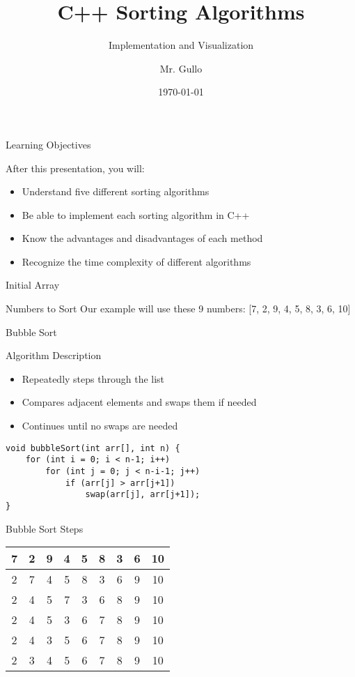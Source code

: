 \documentclass{beamer}
\title[Sorting Algorithms]{C++ Sorting Algorithms}
\subtitle{Implementation and Visualization}
\author[Mr. Gullo]{Mr. Gullo}
\date[\today]{\today}
\begin{document}
\frame{\titlepage}

\begin{frame}{Learning Objectives}
\begin{block}{After this presentation, you will:}
\begin{itemize}
\item Understand five different sorting algorithms
\item Be able to implement each sorting algorithm in C++
\item Know the advantages and disadvantages of each method
\item Recognize the time complexity of different algorithms
\end{itemize}
\end{block}
\end{frame}

\begin{frame}{Initial Array}
\begin{block}{Numbers to Sort}
Our example will use these 9 numbers: [7, 2, 9, 4, 5, 8, 3, 6, 10]
\end{block}
\end{frame}

\begin{frame}[fragile]{Bubble Sort}
\begin{block}{Algorithm Description}
\begin{itemize}
\item Repeatedly steps through the list
\item Compares adjacent elements and swaps them if needed
\item Continues until no swaps are needed
\end{itemize}
\end{block}

\begin{lstlisting}
void bubbleSort(int arr[], int n) {
    for (int i = 0; i < n-1; i++)
        for (int j = 0; j < n-i-1; j++)
            if (arr[j] > arr[j+1])
                swap(arr[j], arr[j+1]);
}
\end{lstlisting}
\end{frame}

\begin{frame}{Bubble Sort Steps}
\begin{center}
\begin{tabular}{|c|c|c|c|c|c|c|c|c|}
\hline
7 & 2 & 9 & 4 & 5 & 8 & 3 & 6 & 10 \\
\hline
2 & 7 & 4 & 5 & 8 & 3 & 6 & 9 & 10 \\
\hline
2 & 4 & 5 & 7 & 3 & 6 & 8 & 9 & 10 \\
\hline
2 & 4 & 5 & 3 & 6 & 7 & 8 & 9 & 10 \\
\hline
2 & 4 & 3 & 5 & 6 & 7 & 8 & 9 & 10 \\
\hline
2 & 3 & 4 & 5 & 6 & 7 & 8 & 9 & 10 \\
\hline
\end{tabular}
\end{center}
\end{frame}
\end{document}
